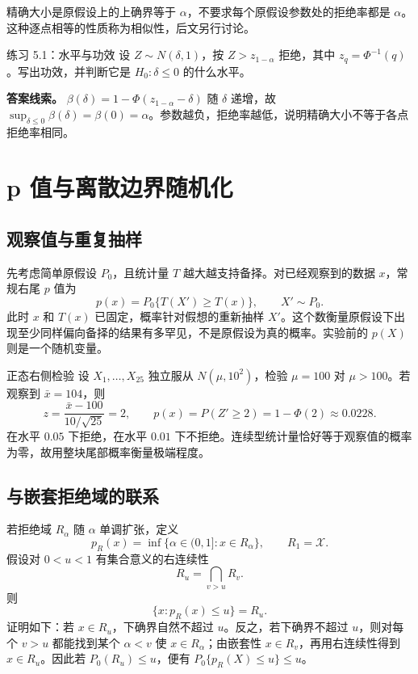 精确大小是原假设上的上确界等于 $\alpha$，不要求每个原假设参数处的拒绝率都是 $\alpha$。这种逐点相等的性质称为相似性，后文另行讨论。

\begin{examplebox}{练习 5.1：水平与功效}
设 $Z\sim N(\delta,1)$，按 $Z>z_{1-\alpha}$ 拒绝，其中 $z_q=\Phi^{-1}(q)$。写出功效，并判断它是 $H_0:\delta\le0$ 的什么水平。

\textbf{答案线索。} $\beta(\delta)=1-\Phi(z_{1-\alpha}-\delta)$ 随 $\delta$ 递增，故 $\sup_{\delta\le0}\beta(\delta)=\beta(0)=\alpha$。参数越负，拒绝率越低，说明精确大小不等于各点拒绝率相同。
\end{examplebox}

\section{p 值与离散边界随机化}

\subsection{观察值与重复抽样}

先考虑简单原假设 $P_0$，且统计量 $T$ 越大越支持备择。对已经观察到的数据 $x$，常规右尾 $p$ 值为
\[
 p(x)=P_0\{T(X')\ge T(x)\},\qquad X'\sim P_0.
\]
此时 $x$ 和 $T(x)$ 已固定，概率针对假想的重新抽样 $X'$。这个数衡量原假设下出现至少同样偏向备择的结果有多罕见，不是原假设为真的概率。实验前的 $p(X)$ 则是一个随机变量。

\begin{examplebox}{正态右侧检验}
设 $X_1,\ldots,X_{25}$ 独立服从 $N(\mu,10^2)$，检验 $\mu=100$ 对 $\mu>100$。若观察到 $\bar x=104$，则
\[
 z=\frac{\bar x-100}{10/\sqrt{25}}=2,\qquad
 p(x)=P(Z'\ge2)=1-\Phi(2)\approx0.0228.
\]
在水平 $0.05$ 下拒绝，在水平 $0.01$ 下不拒绝。连续型统计量恰好等于观察值的概率为零，故用整块尾部概率衡量极端程度。
\end{examplebox}

\subsection{与嵌套拒绝域的联系}

若拒绝域 $R_\alpha$ 随 $\alpha$ 单调扩张，定义
\[
 p_R(x)=\inf\{\alpha\in(0,1]:x\in R_\alpha\},\qquad R_1=\mathcal X.
\]
假设对 $0<u<1$ 有集合意义的右连续性
\[
 R_u=\bigcap_{v>u}R_v.
\]
则
\[
 \{x:p_R(x)\le u\}=R_u.
\]
证明如下：若 $x\in R_u$，下确界自然不超过 $u$。反之，若下确界不超过 $u$，则对每个 $v>u$ 都能找到某个 $\alpha<v$ 使 $x\in R_\alpha$；由嵌套性 $x\in R_v$，再用右连续性得到 $x\in R_u$。因此若 $P_0(R_u)\le u$，便有 $P_0\{p_R(X)\le u\}\le u$。

